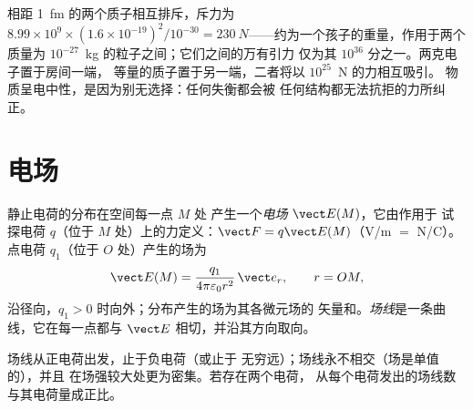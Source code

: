 \begin{example}[有多强]\label{ex:b1:electrostatics-gauss:strong}
相距 \qty{1}{fm} 的两个质子相互排斥，斥力为 $8.99 \times 10^9 \times (1.6 \times
10^{-19})^2/10^{-30} = \qty{230}{N}$——约为一个孩子的重量，作用于两个
质量为 $10^{-27}$~kg 的粒子之间；它们之间的万有引力
仅为其 $10^{36}$ 分之一。两克电子置于房间一端，
等量的质子置于另一端，二者将以 $10^{25}$~N 的力相互吸引。
物质呈电中性，是因为别无选择：任何失衡都会被
任何结构都无法抗拒的力所纠正。
\end{example}

\section{电场}

\begin{definition}[静电场]\label{def:b1:electrostatics-gauss:field}
静止电荷的分布在空间每一点 $M$ 处
产生一个\emph{电场} $\vect E(M)$，它由作用于
试探电荷 $q$（位于 $M$ 处）上的力定义：$\vect F = q\vect E(M)$（\unit{V/m} $=$
\unit{N/C}）。点电荷 $q_1$（位于 $O$ 处）产生的场为
\[
\vect E(M) = \frac{q_1}{4\pi\varepsilon_0 r^2}\,\vect e_r , \qquad r = OM ,
\]
沿径向，$q_1 > 0$ 时向外；分布产生的场为其各微元场的
矢量和。\emph{场线}是一条曲线，它在每一点都与
$\vect E$ 相切，并沿其方向取向。
\end{definition}

\begin{proposition}[读懂场线图]\label{prop:b1:electrostatics-gauss:lines}
场线从正电荷出发，止于负电荷（或止于
无穷远）；场线永不相交（场是单值的），并且
在场强较大处更为密集。若存在两个电荷，
从每个电荷发出的场线数与其电荷量成正比。
\end{proposition}

